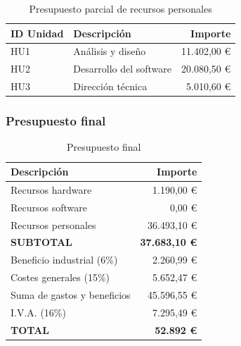 \begin{table}[H]
 \begin{center}
  \begin{tabular}{|l|l|r|}
	\hline
	\textbf{ID Unidad} & \textbf{Descripción} & \textbf{Importe} \\
	\hline
	HU1 & Análisis y diseño & 11.402,00 \euro \\
	\hline
	HU2 & Desarrollo del software & 20.080,50 \euro \\
	\hline
	HU3 & Dirección técnica & 5.010,60 \euro \\
	\hline
  \end{tabular}
  \caption{Presupuesto parcial de recursos personales}
 \end{center}
\end{table}

\subsubsection{Presupuesto final}


\begin{table}[H]
 \begin{center}
  \begin{tabular}{|l|r|}
	\hline
	\textbf{Descripción} & \textbf{Importe} \\ 
	\hline
	Recursos hardware & 1.190,00 \euro \\
	\hline
	Recursos software & 0,00 \euro \\
	\hline
	Recursos personales & 36.493,10 \euro \\
	\hline
	\textbf{SUBTOTAL} & \textbf{37.683,10 \euro} \\
	\hline
	Beneficio industrial (6\%) & 2.260,99 \euro \\
	\hline
	Costes generales (15\%) & 5.652,47 \euro \\
	\hline
	Suma de gastos y beneficios & 45.596,55 \euro \\
	\hline
	I.V.A. (16\%) & 7.295,49 \euro \\
	\hline
	\textbf{TOTAL} & \textbf{52.892 \euro} \\
	\hline
  \end{tabular}
  \caption{Presupuesto final}
 \end{center}
\end{table}
